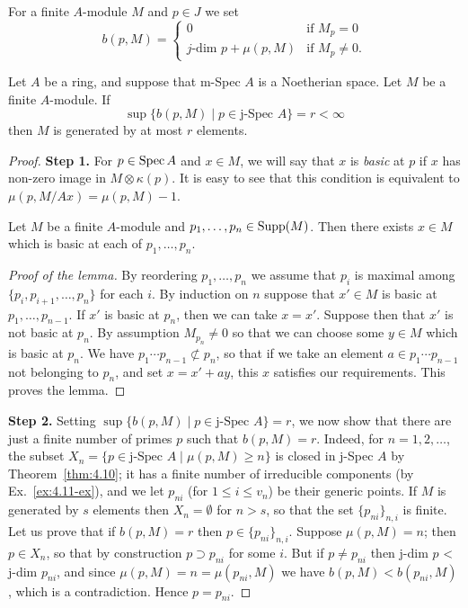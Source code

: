 For a finite $A$-module $M$ and $p \in J$ we set
\[
  b(p, M) =
  \begin{cases}
    0 & \text{if } M_p = 0 \\
    \text{$j$-dim } p + \mu(p, M) & \text{if } M_p \neq 0.
  \end{cases}
\]

\begin{theorem}\label{thm:5.8}
Let $A$ be a ring, and suppose that m-Spec $A$ is
a Noetherian space. Let $M$ be a finite $A$-module. If
\[
  \sup\{b(p, M) \mid p \in \text{j-Spec } A\} = r < \infty
\]
then $M$ is generated by at most $r$ elements.
\end{theorem}

\begin{proof}
\textbf{Step 1.} For $p \in \operatorname{Spec} A$ and $x \in M$, we will say that $x$ is \emph{basic} at $p$ if $x$
has non-zero image in $M \otimes \kappa(p)$. It is easy to see that this condition is
equivalent to $\mu(p, M/Ax) = \mu(p, M) - 1$.

\begin{lemma*}
Let $M$ be a finite $A$-module and $p_1, \ldots, p_n \in \operatorname{Supp}(M)$. Then there
exists $x \in M$ which is basic at each of $p_1, \ldots, p_n$.
\end{lemma*}

\begin{proof}[Proof of the lemma]
By reordering $p_1, \ldots, p_n$ we assume that $p_i$ is maximal among
$\{p_i, p_{i+1}, \ldots, p_n\}$ for each $i$. By induction on $n$ suppose that $x' \in M$ is basic at
$p_1, \ldots, p_{n-1}$. If $x'$ is basic at $p_n$, then we can take $x = x'$. Suppose then that $x'$
is not basic at $p_n$. By assumption $M_{p_n} \neq 0$ so that we can choose some $y \in M$
which is basic at $p_n$. We have $p_1 \cdots p_{n-1} \not\subset p_n$, so that if we take an element
$a \in p_1 \cdots p_{n-1}$ not belonging to $p_n$, and set $x = x' + ay$, this $x$ satisfies our
requirements. This proves the lemma.
\end{proof}

\textbf{Step 2.} Setting $\sup\{b(p, M) \mid p \in \text{j-Spec } A\} = r$, we now show that there are
just a finite number of primes $p$ such that $b(p, M) = r$. Indeed, for
$n = 1, 2, \ldots$, the subset $X_n = \{p \in \text{j-Spec } A \mid \mu(p, M) \ge n\}$ is closed in j-Spec $A$ by
Theorem~\ref{thm:4.10}; it has a finite number of irreducible components (by
Ex.~\ref{ex:4.11-ex}), and we let $p_{ni}$ (for $1 \le i \le v_n$) be their generic points. If $M$ is
generated by $s$ elements then $X_n = \emptyset$ for $n > s$, so that the set $\{p_{ni}\}_{n,i}$ is
finite. Let us prove that if $b(p, M) = r$ then $p \in \{p_{ni}\}_{n,i}$. Suppose
$\mu(p, M) = n$; then $p \in X_n$, so that by construction $p \supset p_{ni}$ for some $i$. But
if $p \neq p_{ni}$ then j-dim $p$ < j-dim $p_{ni}$, and since $\mu(p, M) = n = \mu(p_{ni}, M)$ we have
$b(p, M) < b(p_{ni}, M)$, which is a contradiction. Hence $p = p_{ni}$.


\end{proof}
